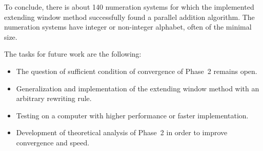  To conclude, there is about 140 numeration systems for which the implemented extending window method successfully found a parallel addition algorithm. The numeration systems have integer or non-integer alphabet, often of the minimal size.
 
The tasks for future work are the following:

\begin{itemize}
	\item The question of sufficient condition of convergence of Phase~2 remains open.
	\item Generalization and implementation of the extending window method with an arbitrary rewriting rule.
	\item Testing on a  computer with higher performance or faster implementation.
	\item Development of theoretical analysis of Phase~2 in order to improve convergence and speed.
\end{itemize}

